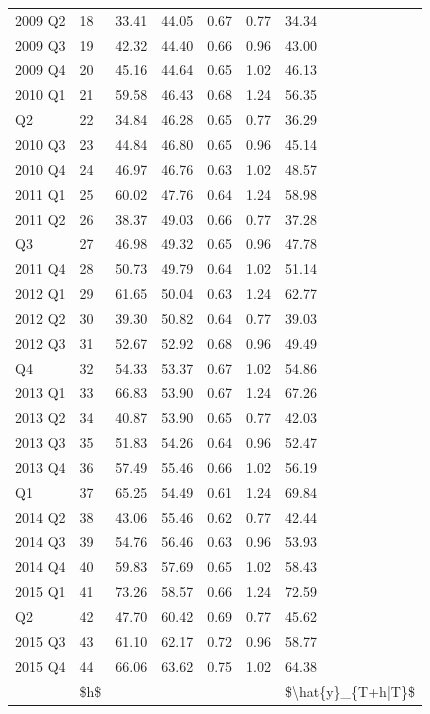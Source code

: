\documentclass[]{book}
\begin{document}
\begin{table}[t]
\begin{tabular}{lllllll}
2009 Q2 & 18 & 33.41 & 44.05 & 0.67 & 0.77 & 34.34\\
2009 Q3 & 19 & 42.32 & 44.40 & 0.66 & 0.96 & 43.00\\
2009 Q4 & 20 & 45.16 & 44.64 & 0.65 & 1.02 & 46.13\\
2010 Q1 & 21 & 59.58 & 46.43 & 0.68 & 1.24 & 56.35\\
\addlinespace
2010 Q2 & 22 & 34.84 & 46.28 & 0.65 & 0.77 & 36.29\\
2010 Q3 & 23 & 44.84 & 46.80 & 0.65 & 0.96 & 45.14\\
2010 Q4 & 24 & 46.97 & 46.76 & 0.63 & 1.02 & 48.57\\
2011 Q1 & 25 & 60.02 & 47.76 & 0.64 & 1.24 & 58.98\\
2011 Q2 & 26 & 38.37 & 49.03 & 0.66 & 0.77 & 37.28\\
\addlinespace
2011 Q3 & 27 & 46.98 & 49.32 & 0.65 & 0.96 & 47.78\\
2011 Q4 & 28 & 50.73 & 49.79 & 0.64 & 1.02 & 51.14\\
2012 Q1 & 29 & 61.65 & 50.04 & 0.63 & 1.24 & 62.77\\
2012 Q2 & 30 & 39.30 & 50.82 & 0.64 & 0.77 & 39.03\\
2012 Q3 & 31 & 52.67 & 52.92 & 0.68 & 0.96 & 49.49\\
\addlinespace
2012 Q4 & 32 & 54.33 & 53.37 & 0.67 & 1.02 & 54.86\\
2013 Q1 & 33 & 66.83 & 53.90 & 0.67 & 1.24 & 67.26\\
2013 Q2 & 34 & 40.87 & 53.90 & 0.65 & 0.77 & 42.03\\
2013 Q3 & 35 & 51.83 & 54.26 & 0.64 & 0.96 & 52.47\\
2013 Q4 & 36 & 57.49 & 55.46 & 0.66 & 1.02 & 56.19\\
\addlinespace
2014 Q1 & 37 & 65.25 & 54.49 & 0.61 & 1.24 & 69.84\\
2014 Q2 & 38 & 43.06 & 55.46 & 0.62 & 0.77 & 42.44\\
2014 Q3 & 39 & 54.76 & 56.46 & 0.63 & 0.96 & 53.93\\
2014 Q4 & 40 & 59.83 & 57.69 & 0.65 & 1.02 & 58.43\\
2015 Q1 & 41 & 73.26 & 58.57 & 0.66 & 1.24 & 72.59\\
\addlinespace
2015 Q2 & 42 & 47.70 & 60.42 & 0.69 & 0.77 & 45.62\\
2015 Q3 & 43 & 61.10 & 62.17 & 0.72 & 0.96 & 58.77\\
2015 Q4 & 44 & 66.06 & 63.62 & 0.75 & 1.02 & 64.38\\
 & \$h\$ &  &  &  &  & \$\textbackslash{}hat\{y\}\_\{T+h|T\}\$\\

\end{tabular}
\end{table}
\end{document}
